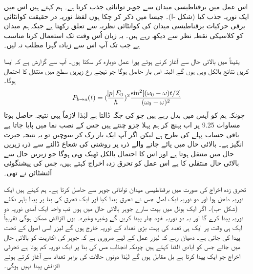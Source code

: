 اس عمل میں برقناطیسی میدان سے جوہر  توانائی جذب کرتا ہے۔ ہم کہتے ہیں اس میں ایک نوریہ جذب کیا (شکل -ا)۔  جیسا میں ذکر کر چکا ہوں لفظ نوریہ در حقیقت کوانٹائی برقی حرکیات برقناطیسی میدان کی کوانٹائی نظریہ سے تعلق رکھتا ہے جبکہ ہم میدان کو کلاسیکی نقطہ نظر سے دیکھ رہے ہیں۔ یہ زبان اُس وقت تک استعمال کرنا مناسب ہے جب تک آپ اس سے زیادہ گہرا مطلب نہ لیں۔

یقیناً میں بالائی حال  سے آغاز کرتے ہوئے پورا عمل دوبارہ کر سکتا ہوں۔ آپ سے گزارش ہے کہ ایسا کریں نتائج بالکل وہی ہوں گے البتہ اس بار  حاصل ہوگا جو نیچے رخ زیریں سطح  میں منتقل کا احتمال ہوگا۔
\begin{align}
	P_{b\rightarrow a} (t) = (\frac{\abs{p}E_0}{\hbar})^2 \frac{\sin^2[(\omega_0 - \omega)t/2]}{(\omega_0 - \omega)^2}
\end{align}
چونکہ ہم  کو آپس میں بدل رہے ہیں جو  کی جگہ  ڈالتا ہے لہٰذا لازماً یہی نتیجہ حاصل ہوتا مساوات \num{9.25} پر اب پہنچ کر ہم پہلا جزو  چنتے ہیں جس کے نصب نما میں  پایا جاتا ہے باقی حساب پہلے کی طرح ہے لیکن اگر آپ ایک بار رک کر سوچیں تو یہ نتیجہ حیرت انگیز ہے۔ بالائی حال میں پائے جانے والے ذرہ پر روشنی کی شعاع ڈالنے سے ذرہ زیریں حال میں منتقل ہوتا ہے اور اس کا احتمال بالکل ٹھیک وہی ہوگا جو زیریں حال سے بالائی حال منتقلی کا ہے اس عمل کو تحرق   زدہ اخراج کہتے ہیں،  جس کی پیشنگوئی آئنشٹائن نے  تھی۔

تحرق زدہ اخراج کی صورت میں برقناطیسی میدان توانائی  جوہر سے حاصل کرتا ہے۔ ہم کہتے ہیں ایک نوریہ داخل ہوا اور دو نوریہ ایک اصل جس نے تحرق پیدا کیا اور ایک تحرق کی بنا پر پیدا باہر نکلے   (شکل -ب)۔ اگر ایک بوتل میں بہت سارے جوہر بالائی حال میں ہوں تب واحد ایک آمدی نوریہ دو نوریہ پیدا کرے گا اور یہ دو نوریہ خود چار پیدا کریں گے وغیرہ وغیرہ۔ یوں  افزائش   ممکن ہوگی تقریباً ایک ہی وقت پر ایک ہی تعدد کی بہت بڑی تعداد کے نوریہ خارج ہوں گے لیزر اسی اصول کے تحت پیدا کی جاتی ہے۔ دھیان رہے کہ لیزر عمل کے لیے ضروری ہے کہ جوہر کی   اکثریت  کو بالائی حال میں جائے جس کو آبادی الٹنا  کہتے ہیں چونکہ انجذاب ھس کی بنا پر ایک نوریہ کم ہوتا ہے تحرقی اخراج جو ایک پیدا کرتا ہے بل مقابل ہوں گے لہٰذا دونوں حالات کی برابر تعداد سے آغاز کرتے ہوئے افزائش  پیدا نہیں ہوگی۔ 


